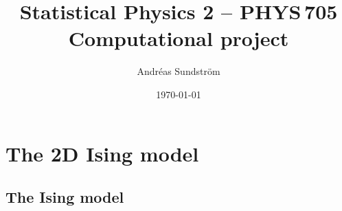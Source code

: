 \documentclass[11pt,letter, swedish, english
]{article}
\begin{document}




\title{Statistical Physics 2 -- PHYS\,705 \\
Computational project}
\author{Andréas Sundström}
\date{\today}

\maketitle


\section{The 2D Ising model}


\subsection{The Ising model}

\end{document}

